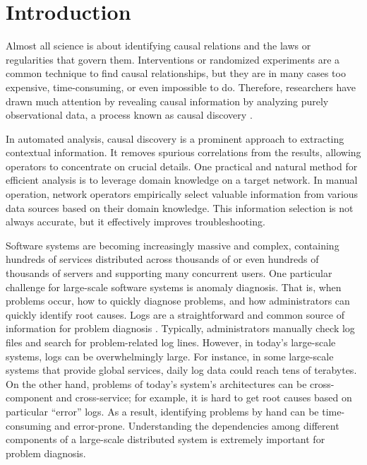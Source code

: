 \section{Introduction}
Almost all science is about identifying causal relations and the laws or regularities that govern them. Interventions or randomized experiments are a common technique to find causal relationships, but they are in many cases too expensive, time-consuming, or even impossible to do. Therefore, researchers have drawn much attention by revealing causal information by analyzing purely observational data, a process known as causal discovery \cite{spirtes2000causation}. \newline

In automated analysis, causal discovery is a prominent approach to extracting contextual information. It removes spurious correlations from the results, allowing operators to concentrate on crucial details. One practical and natural method for efficient analysis is to leverage domain knowledge on a target network. In manual operation, network operators empirically select valuable information from various data sources based on their domain knowledge. This information selection is not always accurate, but it effectively improves troubleshooting. \newline

Software systems are becoming increasingly massive and complex, containing hundreds of services distributed across thousands of or even hundreds of thousands of servers and supporting many concurrent users. One particular challenge for large-scale software systems is anomaly diagnosis. That is, when problems occur, how to quickly diagnose problems, and how administrators can quickly identify root causes. Logs are a straightforward and common source of information for problem diagnosis \cite{aussel2018improving,du2017deeplog,otomo2019latent}. Typically, administrators manually check log files and search for problem-related log lines. However, in today’s large-scale systems, logs can be overwhelmingly large. For instance, in some large-scale systems that provide global services, daily log data could reach tens of terabytes. On the other hand, problems of today’s system’s architectures can be cross-component and cross-service; for example, it is hard to get root causes based on particular “error” logs. As a result, identifying problems by hand can be time-consuming and error-prone. Understanding the dependencies among different components of a large-scale distributed system is extremely important for problem diagnosis.


